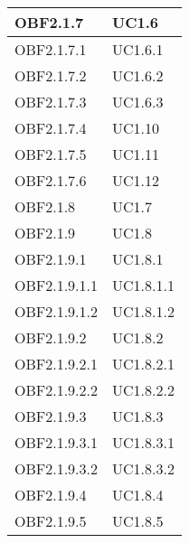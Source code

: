 \documentclass{scalatekids-article}
\begin{document}
\begin{longtable}[H]{|p{5.5cm}|p{5.5cm}|}
  \hline
  OBF2.1.7 & \multiLineCell[t]{UC1.6\\}\\
  \hline
  OBF2.1.7.1 & \multiLineCell[t]{UC1.6.1\\}\\
  \hline
  OBF2.1.7.2 & \multiLineCell[t]{UC1.6.2\\}\\
  \hline
  OBF2.1.7.3 & \multiLineCell[t]{UC1.6.3\\}\\
  \hline
  OBF2.1.7.4 & \multiLineCell[t]{UC1.10\\}\\
  \hline
  OBF2.1.7.5 & \multiLineCell[t]{UC1.11\\}\\
  \hline
  OBF2.1.7.6 & \multiLineCell[t]{UC1.12\\}\\
  \hline
  OBF2.1.8 & \multiLineCell[t]{UC1.7\\}\\
  \hline
  OBF2.1.9 & \multiLineCell[t]{UC1.8\\}\\
  \hline
  OBF2.1.9.1 & \multiLineCell[t]{UC1.8.1\\}\\
  \hline
  OBF2.1.9.1.1 & \multiLineCell[t]{UC1.8.1.1\\}\\
  \hline
  OBF2.1.9.1.2 & \multiLineCell[t]{UC1.8.1.2\\}\\
  \hline
  OBF2.1.9.2 & \multiLineCell[t]{UC1.8.2\\}\\
  \hline
  OBF2.1.9.2.1 & \multiLineCell[t]{UC1.8.2.1\\}\\
  \hline
  OBF2.1.9.2.2 & \multiLineCell[t]{UC1.8.2.2\\}\\
  \hline
  OBF2.1.9.3 & \multiLineCell[t]{UC1.8.3\\}\\
  \hline
  OBF2.1.9.3.1 & \multiLineCell[t]{UC1.8.3.1\\}\\
  \hline
  OBF2.1.9.3.2 & \multiLineCell[t]{UC1.8.3.2\\}\\
  \hline
  OBF2.1.9.4 & \multiLineCell[t]{UC1.8.4\\}\\
  \hline
  OBF2.1.9.5 & \multiLineCell[t]{UC1.8.5\\}\\

\end{longtable}
\end{document}
